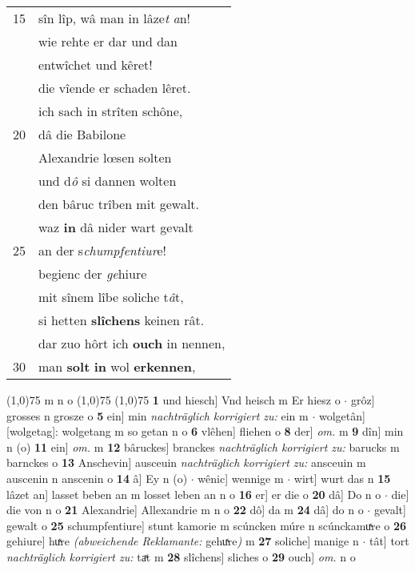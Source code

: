 \documentclass[8pt,a4paper,notitlepage]{article}
\begin{document}
\begin{table}[ht]
\begin{minipage}[t]{0.5\linewidth}
\begin{tabular}{rl}
15 & sîn lîp, wâ man in lâze\textit{t} \textit{a}n!\\ 
 & wie rehte er dar und dan\\ 
 & entwîchet und kêret!\\ 
 & die vîende er schaden lêret.\\ 
 & ich sach in strîten schône,\\ 
20 & dâ die Babilone\\ 
 & Alexandrie lœsen solten\\ 
 & und d\textit{ô} si dannen wolten\\ 
 & den bâruc trîben mit gewalt.\\ 
 & waz \textbf{in} dâ nider wart gevalt\\ 
25 & an der s\textit{chumpfentiur}e!\\ 
 & begienc der \textit{ge}hiure\\ 
 & mit sînem lîbe soliche t\textit{â}t,\\ 
 & si hetten \textbf{slîchens} keinen rât.\\ 
 & dar zuo hôrt ich \textbf{ouch} in nennen,\\ 
30 & man \textbf{solt} \textbf{in} wol \textbf{erkennen},\\ 
\end{tabular}
\scriptsize
\line(1,0){75} \newline
m n o \newline
\line(1,0){75} \newline
\newline
\line(1,0){75} \newline
\textbf{1} und hiesch] Vnd heisch m Er hiesz o  $\cdot$ grôz] grosses n grosze o \textbf{5} ein] min \textit{nachträglich korrigiert zu:} ein m  $\cdot$ wolgetân] [wolgetag]: wolgetang m so getan n o \textbf{6} vlêhen] fliehen o \textbf{8} der] \textit{om.} m \textbf{9} dîn] min n (o) \textbf{11} ein] \textit{om.} m \textbf{12} bâruckes] branckes \textit{nachträglich korrigiert zu:} barucks m barnckes o \textbf{13} Anschevin] ausceuin \textit{nachträglich korrigiert zu:} ansceuin m auscenin n anscenin o \textbf{14} â] Ey n (o)  $\cdot$ wênic] wennige m  $\cdot$ wirt] wurt das n \textbf{15} lâzet an] lasset beben an m losset leben an n o \textbf{16} er] er die o \textbf{20} dâ] Do n o  $\cdot$ die] die von n o \textbf{21} Alexandrie] Allexandrie m n o \textbf{22} dô] da m \textbf{24} dâ] do n o  $\cdot$ gevalt] gewalt o \textbf{25} schumpfentiure] stunt kamorie m scúncken múre n scúnckamuͯre o \textbf{26} gehiure] huͯre \textit{(abweichende Reklamante:} gehuͯre\textit{)} m \textbf{27} soliche] manige n  $\cdot$ tât] tort \textit{nachträglich korrigiert zu:} taͯt m \textbf{28} slîchens] sliches o \textbf{29} ouch] \textit{om.} n o \newline
\end{minipage}
\end{table}
\end{document}
